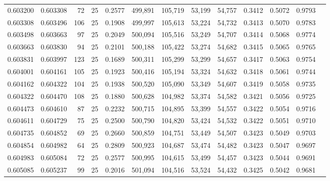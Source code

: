 \begin{tabular}{rrrrrrrrrrrrr}
0.603200 & 0.603308 &    72 &  25 &                                     0.2577 & 499,891 & 105,719 &  53,199 &  54,757 & 0.3412 & 0.5072 & 0.9793 \\
0.603308 & 0.603496 &   106 &  25 &                                     0.1908 & 499,997 & 105,613 &  53,224 &  54,732 & 0.3413 & 0.5070 & 0.9783 \\
0.603498 & 0.603663 &    97 &  25 &                                     0.2049 & 500,094 & 105,516 &  53,249 &  54,707 & 0.3414 & 0.5068 & 0.9774 \\
0.603663 & 0.603830 &    94 &  25 &                                     0.2101 & 500,188 & 105,422 &  53,274 &  54,682 & 0.3415 & 0.5065 & 0.9765 \\
0.603831 & 0.603997 &   123 &  25 &                                     0.1689 & 500,311 & 105,299 &  53,299 &  54,657 & 0.3417 & 0.5063 & 0.9754 \\
0.604001 & 0.604161 &   105 &  25 &                                     0.1923 & 500,416 & 105,194 &  53,324 &  54,632 & 0.3418 & 0.5061 & 0.9744 \\
0.604162 & 0.604322 &   104 &  25 &                                     0.1938 & 500,520 & 105,090 &  53,349 &  54,607 & 0.3419 & 0.5058 & 0.9735 \\
0.604322 & 0.604470 &   108 &  25 &                                     0.1880 & 500,628 & 104,982 &  53,374 &  54,582 & 0.3421 & 0.5056 & 0.9725 \\
0.604473 & 0.604610 &    87 &  25 &                                     0.2232 & 500,715 & 104,895 &  53,399 &  54,557 & 0.3422 & 0.5054 & 0.9716 \\
0.604611 & 0.604729 &    75 &  25 &                                     0.2500 & 500,790 & 104,820 &  53,424 &  54,532 & 0.3422 & 0.5051 & 0.9710 \\
0.604735 & 0.604852 &    69 &  25 &                                     0.2660 & 500,859 & 104,751 &  53,449 &  54,507 & 0.3423 & 0.5049 & 0.9703 \\
0.604854 & 0.604982 &    64 &  25 &                                     0.2809 & 500,923 & 104,687 &  53,474 &  54,482 & 0.3423 & 0.5047 & 0.9697 \\
0.604983 & 0.605084 &    72 &  25 &                                     0.2577 & 500,995 & 104,615 &  53,499 &  54,457 & 0.3423 & 0.5044 & 0.9691 \\
0.605085 & 0.605237 &    99 &  25 &                                     0.2016 & 501,094 & 104,516 &  53,524 &  54,432 & 0.3425 & 0.5042 & 0.9681 \\

\end{tabular}
